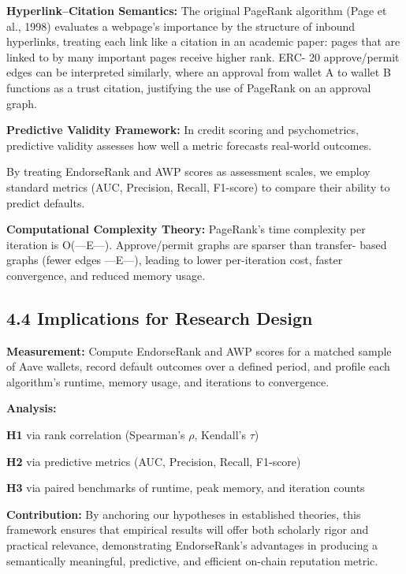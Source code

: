 \documentclass[12pt]{article}
\newcommand{\proposalSubheading}[1]{%
  \par\addvspace{0.38\baselineskip}%
  \noindent\textbf{#1}\par\nobreak\addvspace{0.08\baselineskip}%
}
\begin{document}
\textbf{Hyperlink--Citation Semantics: }The original PageRank algorithm (Page et al., 1998) evaluates a webpage's importance by the structure of inbound hyperlinks, treating each link like a citation in an academic paper: pages that are linked to by many important pages receive higher rank. ERC- 20 approve/permit edges can be interpreted similarly, where an approval from wallet A to wallet B functions as a trust citation, justifying the use of PageRank on an approval graph.


\textbf{Predictive Validity Framework: }In credit scoring and psychometrics, predictive validity assesses how well a metric forecasts real-world outcomes.


By treating EndorseRank and AWP scores as assessment scales, we employ standard metrics (AUC, Precision, Recall, F1-score) to compare their ability to predict defaults.


\textbf{Computational Complexity Theory: }PageRank's time complexity per iteration is O(---E---). Approve/permit graphs are sparser than transfer- based graphs (fewer edges ---E---), leading to lower per-iteration cost, faster convergence, and reduced memory usage.


\subsection*{4.4 Implications for Research Design}
\label{sec:implications-for-research-design}

\textbf{Measurement: }Compute EndorseRank and AWP scores for a matched sample of Aave wallets, record default outcomes over a defined period, and profile each algorithm's runtime, memory usage, and iterations to convergence.


\proposalSubheading{Analysis:}

\textbf{H1 }via rank correlation (Spearman's \emph{\(\rho\)}, Kendall's \emph{\(\tau\)})


\textbf{H2 }via predictive metrics (AUC, Precision, Recall, F1-score)


\textbf{H3 }via paired benchmarks of runtime, peak memory, and iteration counts


\textbf{Contribution: }By anchoring our hypotheses in established theories, this framework ensures that empirical results will offer both scholarly rigor and practical relevance, demonstrating EndorseRank's advantages in producing a semantically meaningful, predictive, and efficient on-chain reputation metric.
\end{document}
